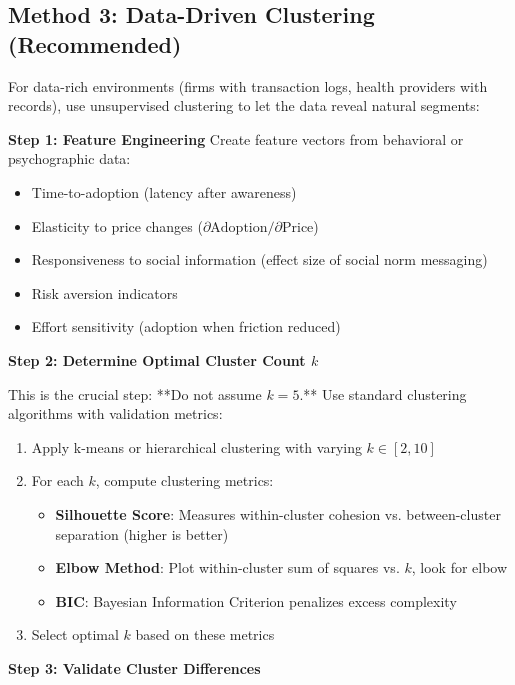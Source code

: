 \subsection{Method 3: Data-Driven Clustering (Recommended)}
\label{sec:clustering}

For data-rich environments (firms with transaction logs, health providers with records),
use unsupervised clustering to let the data reveal natural segments:

\textbf{Step 1: Feature Engineering}
Create feature vectors from behavioral or psychographic data:
\begin{itemize}[nosep]
    \item Time-to-adoption (latency after awareness)
    \item Elasticity to price changes ($\partial \text{Adoption} / \partial \text{Price}$)
    \item Responsiveness to social information (effect size of social norm messaging)
    \item Risk aversion indicators
    \item Effort sensitivity (adoption when friction reduced)
\end{itemize}

\textbf{Step 2: Determine Optimal Cluster Count $k$}

This is the crucial step: **Do not assume $k=5$.** Use standard clustering algorithms
with validation metrics:

\begin{enumerate}
    \item Apply k-means or hierarchical clustering with varying $k \in [2, 10]$
    \item For each $k$, compute clustering metrics:
    \begin{itemize}[nosep]
        \item \textbf{Silhouette Score}: Measures within-cluster cohesion vs. between-cluster separation (higher is better)
        \item \textbf{Elbow Method}: Plot within-cluster sum of squares vs. $k$, look for elbow
        \item \textbf{BIC}: Bayesian Information Criterion penalizes excess complexity
    \end{itemize}
    \item Select optimal $k$ based on these metrics
\end{enumerate}

\textbf{Step 3: Validate Cluster Differences}

